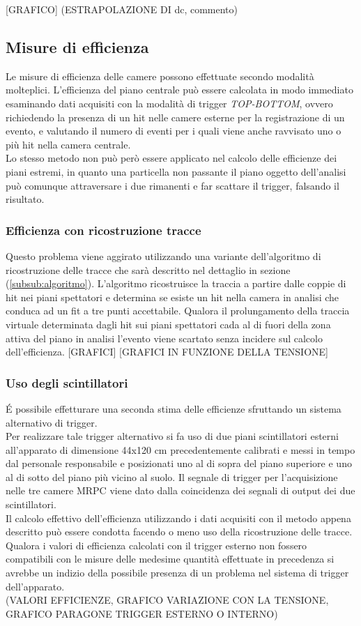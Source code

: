 \documentclass[8pt]{extarticle}
\begin{document}
[GRAFICO]
(ESTRAPOLAZIONE DI dc, commento)
\subsection{Misure di efficienza}
Le misure di efficienza delle camere possono effettuate secondo modalità molteplici. L'efficienza del piano centrale può essere calcolata in modo immediato esaminando dati acquisiti con la modalità di trigger \textit{TOP-BOTTOM}, ovvero richiedendo la presenza di un hit nelle camere esterne per la registrazione di un evento, e valutando il numero di eventi per i quali viene anche ravvisato uno o più hit nella camera centrale. \\
Lo stesso metodo non può però essere applicato nel calcolo delle efficienze dei piani estremi, in quanto una particella non passante il piano oggetto dell'analisi può comunque attraversare i due rimanenti e far scattare il trigger, falsando il risultato.
\subsubsection{Efficienza con ricostruzione tracce}
Questo problema viene aggirato utilizzando una variante dell'algoritmo di ricostruzione delle tracce che sarà descritto nel dettaglio in sezione (\ref{subsub:algoritmo}). L'algoritmo ricostruisce la traccia a partire dalle coppie di hit nei piani spettatori e determina se esiste un hit nella camera in analisi che conduca ad un fit a tre punti accettabile. Qualora il prolungamento della traccia virtuale determinata dagli hit sui piani spettatori cada al di fuori della zona attiva del piano in analisi l'evento viene scartato senza incidere sul calcolo dell'efficienza.
[GRAFICI]
[GRAFICI IN FUNZIONE DELLA TENSIONE]

\subsubsection{Uso degli scintillatori}
\'E possibile effetturare una seconda stima delle efficienze sfruttando un sistema alternativo di trigger. \\
Per realizzare tale trigger alternativo si fa uso di due piani scintillatori esterni all'apparato di dimensione 44x120 cm precedentemente calibrati e messi in tempo dal personale responsabile e posizionati uno al di sopra del piano superiore e uno al di sotto del piano più vicino al suolo. Il segnale di trigger per l'acquisizione nelle tre camere  MRPC viene dato dalla coincidenza dei segnali di output dei due scintillatori. \\
Il calcolo effettivo dell'efficienza utilizzando i dati acquisiti con il metodo appena descritto può essere condotta facendo o meno uso della ricostruzione delle tracce.
Qualora i valori di efficienza calcolati con il trigger esterno non fossero compatibili con le misure delle medesime quantità effettuate in precedenza si avrebbe un indizio della possibile presenza di un problema nel sistema di trigger dell'apparato.\\
(VALORI EFFICIENZE, GRAFICO VARIAZIONE CON LA TENSIONE, GRAFICO PARAGONE TRIGGER ESTERNO O INTERNO)
\end{document}
